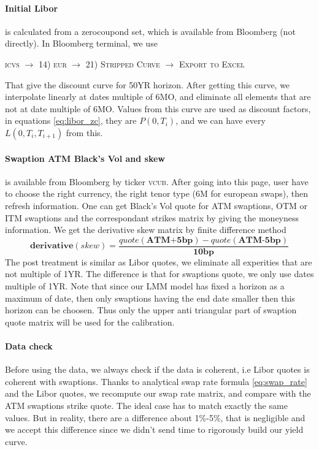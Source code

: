 \documentclass[a4paper,10pt]{article}
\newcommand{\bl}[1]{{\scshape  #1}}
\begin{document}
\paragraph{Initial Libor} is calculated from a zerocoupond set, which is available from Bloomberg (not directly). In Bloomberg terminal, we use 
\begin{center}
\bl{icvs} $\longrightarrow$ \bl{14) eur} $\longrightarrow$ \bl{21) Stripped Curve} $\longrightarrow$  \bl{Export to Excel} 
\end{center}
That give the discount curve for 50YR horizon. After getting this curve, we interpolate linearly at dates multiple of 6MO, and eliminate all elements that are not at date multiple of 6MO. Values from this curve are used as discount factors, in equations \ref{eq:libor_zc}, they are $P(0,T_{i})$, and we can have every $L(0,T_{i},T_{i+1})$ from this. 
\paragraph{Swaption ATM Black's Vol and skew} is available from Bloomberg by ticker \bl{vcub}. After going into this page, user have to choose the right currency, the right tenor type (6M for european swaps), then refresh information. One can get Black's Vol quote for ATM swaptions, OTM or ITM swaptions and the correspondant strikes matrix by giving the moneyness information. We get the derivative skew matrix by finite difference method
\[
\textbf{derivative}(skew) = \frac{quote (\textbf{ATM+5bp}) - quote(\textbf{ATM-5bp}) }{\textbf{10bp}}
\]
The post treatment is similar as Libor quotes, we eliminate all experities that are not multiple of 1YR. The difference is that for swaptions quote, we only use dates multiple of 1YR. Note that since our LMM model has fixed a horizon as a maximum of date, then only swaptions having the end date smaller then this horizon can be choosen. Thus only the upper anti triangular part of swaption quote matrix will be used for the calibration.
\paragraph{Data check}
Before using the data, we always check if the data is coherent, i.e Libor quotes is coherent with swaptions. Thanks to analytical swap rate formula \ref{eq:swap_rate} and the Libor quotes, we recompute our swap rate matrix, and compare with the ATM swaptions strike quote. The ideal case has to match exactly the same values. But in reality, there are a difference about 1\%-5\%, that is negligible and we accept this difference since we didn't send time to rigorously build our yield curve.    
\end{document}
